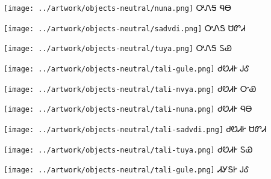 \documentclass[avery5371]{flashcards}%
\begin{document}
\begin{flashcard}{
\texttt{[image: ../artwork/objects-neutral/nuna.png]}
}\Huge ᎤᏁᎦ ᏄᎾ
\end{flashcard}

\begin{flashcard}{
\texttt{[image: ../artwork/objects-neutral/sadvdi.png]}
}\Huge ᎤᏁᎦ ᏌᏛᏗ
\end{flashcard}

\begin{flashcard}{
\texttt{[image: ../artwork/objects-neutral/tuya.png]}
}\Huge ᎤᏁᎦ ᏚᏯ
\end{flashcard}

\begin{flashcard}{
\texttt{[image: ../artwork/objects-neutral/tali-gule.png]}
}\Huge ᏧᏬᏗᎨ ᎫᎴ
\end{flashcard}

\begin{flashcard}{
\texttt{[image: ../artwork/objects-neutral/tali-nvya.png]}
}\Huge ᏧᏬᏗᎨ ᏅᏯ
\end{flashcard}

\begin{flashcard}{
\texttt{[image: ../artwork/objects-neutral/tali-nuna.png]}
}\Huge ᏧᏬᏗᎨ ᏄᎾ
\end{flashcard}

\begin{flashcard}{
\texttt{[image: ../artwork/objects-neutral/tali-sadvdi.png]}
}\Huge ᏧᏬᏗᎨ ᏌᏛᏗ
\end{flashcard}

\begin{flashcard}{
\texttt{[image: ../artwork/objects-neutral/tali-tuya.png]}
}\Huge ᏧᏬᏗᎨ ᏚᏯ
\end{flashcard}

\begin{flashcard}{
\texttt{[image: ../artwork/objects-neutral/tali-gule.png]}
}\Huge ᏗᎩᎦᎨ ᎫᎴ
\end{flashcard}
\end{document}
